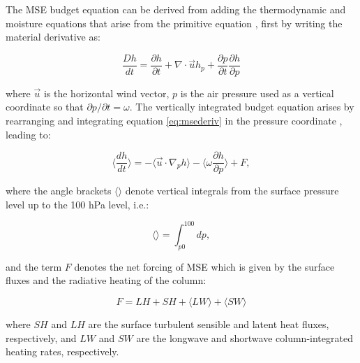 The MSE budget equation can be derived from adding the thermodynamic and moisture equations that arise from the primitive equation \citep{neelin2005}, first by writing the material derivative as:

\begin{equation}
\frac{Dh}{dt}=\frac{\partial h}{\partial t}+\nabla\cdot{\vec{u}h}_p+\frac{\partial p}{\partial t}\frac{\partial h}{\partial p}
\label{eq:msederiv}
\end{equation}

\noindent where $\vec{u}$ is the horizontal wind vector, $p$ is the air pressure used as a vertical coordinate so that $\partial p/\partial t = \omega$. 
The vertically integrated budget equation arises by rearranging and integrating equation \ref{eq:msederiv} in the pressure coordinate \citep{back2006,inoue2015,annamalai2020}, leading to:

\begin{equation}
\Bigg\langle \frac{d h}{dt} \Bigg\rangle=-\Bigg\langle \vec{u}\cdot\nabla _p h  \Bigg\rangle -\Bigg\langle \omega\frac{\partial h}{\partial p}\Bigg\rangle + F,
\label{eq:msebudget}
\end{equation}

\noindent where the angle brackets $\langle \rangle$ denote vertical integrals from the surface pressure level up to the 100 hPa level, i.e.:

\begin{equation}
\Bigg\langle \Bigg\rangle= \int_{p0}^{100} dp, 
\end{equation}

\noindent and the term $F$ denotes the net forcing of MSE which is given by the surface fluxes and the radiative heating of the column:

\begin{equation}
F= LH+SH+\langle LW \rangle + \langle  SW \rangle
\end{equation}

\noindent where $SH$ and $LH$ are the surface turbulent sensible and latent heat fluxes, respectively, and $LW$ and $SW$ are the longwave and shortwave column-integrated heating rates, respectively.



